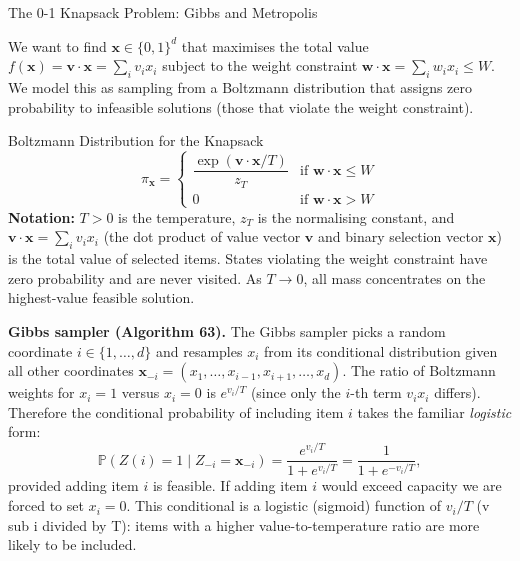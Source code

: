 \documentclass[aspectratio=169,10pt]{beamer}
\newcommand{\Prob}{\mathbb{P}}
\newcommand{\bx}{\mathbf{x}}
\newcommand{\bv}{\mathbf{v}}
\newcommand{\bw}{\mathbf{w}}
\begin{document}
\begin{frame}[allowframebreaks]{The 0-1 Knapsack Problem: Gibbs and Metropolis}

We want to find $\bx \in \{0,1\}^d$ that maximises the total value
$f(\bx) = \bv \cdot \bx = \sum_i v_i x_i$ subject to the weight constraint
$\bw \cdot \bx = \sum_i w_i x_i \le W$.  We model this as sampling from a
Boltzmann distribution that assigns zero probability to infeasible solutions
(those that violate the weight constraint).

\begin{block}{Boltzmann Distribution for the Knapsack}
  \[
    \pi_{\bx} = \begin{cases}
      \dfrac{\exp(\bv\cdot\bx / T)}{z_T} & \text{if } \bw\cdot\bx \le W\\[8pt]
      0 & \text{if } \bw\cdot\bx > W
    \end{cases}
  \]
  \textbf{Notation:} $T > 0$ is the temperature, $z_T$ is the normalising
  constant, and $\bv \cdot \bx = \sum_i v_i x_i$ (the dot product of value
  vector $\bv$ and binary selection vector $\bx$) is the total value of
  selected items.  States violating the weight constraint have zero
  probability and are never visited.  As $T \to 0$, all mass concentrates
  on the highest-value feasible solution.
\end{block}

\medskip
\textbf{Gibbs sampler (Algorithm 63).}
The Gibbs sampler picks a random coordinate $i \in \{1,\ldots,d\}$ and
resamples $x_i$ from its conditional distribution given all other
coordinates $\bx_{-i} = (x_1,\ldots,x_{i-1},x_{i+1},\ldots,x_d)$.  The
ratio of Boltzmann weights for $x_i = 1$ versus $x_i = 0$ is $e^{v_i/T}$
(since only the $i$-th term $v_i x_i$ differs).  Therefore the conditional
probability of including item $i$ takes the familiar \emph{logistic} form:
\[
  \Prob(Z(i)=1 \mid Z_{-i}=\bx_{-i})
  = \frac{e^{v_i/T}}{1 + e^{v_i/T}}
  = \frac{1}{1 + e^{-v_i/T}},
\]
provided adding item $i$ is feasible.  If adding item $i$ would exceed
capacity we are forced to set $x_i = 0$.  This conditional is a logistic
(sigmoid) function of $v_i/T$ (v sub i divided by T): items with a higher
value-to-temperature ratio are more likely to be included.


\end{frame}
\end{document}
